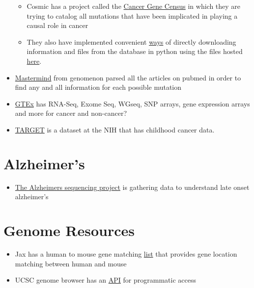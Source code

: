 \documentclass[]{book}
\providecommand{\tightlist}{%
  \setlength{\itemsep}{0pt}\setlength{\parskip}{0pt}}
\begin{document}
\begin{itemize}
  \begin{itemize}
  \tightlist
  \item
    Cosmic has a project called the \href{https://cancer.sanger.ac.uk/cosmic/census?genome=37}{Cancer Gene Census} in which they are trying to catalog all mutations that have been implicated in playing a causal role in cancer
  \item
    They also have implemented convenient \href{https://cancer.sanger.ac.uk/cosmic/help/file_download}{ways} of directly downloading information and files from the database in python using the files hosted \href{https://cancer.sanger.ac.uk/cosmic/download}{here}.
  \end{itemize}
\item
  \href{https://mastermind.genomenon.com/api}{Mastermind} from genomenon parsed all the articles on pubmed in order to find any and all information for each possible mutation
\item
  \href{https://gtexportal.org/home/}{GTEx} has RNA-Seq, Exome Seq, WGseq, SNP arrays, gene expression arrays and more for cancer and non-cancer?
\item
  \href{https://ocg.cancer.gov/programs/target}{TARGET} is a dataset at the NIH that has childhood cancer data.
\end{itemize}

\hypertarget{alzheimers}{%
\section{Alzheimer's}\label{alzheimers}}

\begin{itemize}
\tightlist
\item
  \href{https://www.niagads.org/adsp/content/home}{The Alzheimers sequencing project} is gathering data to understand late onset alzheimer's
\end{itemize}

\hypertarget{genome-resources}{%
\section{Genome Resources}\label{genome-resources}}

\begin{itemize}
\tightlist
\item
  Jax has a human to mouse gene matching \href{http://www.informatics.jax.org/downloads/reports/HOM_MouseHumanSequence.rpt}{list} that provides gene location matching between human and mouse
\item
  UCSC genome browser has an \href{http://genomewiki.ucsc.edu/index.php/Programmatic_access_to_the_Genome_Browser}{API} for programmatic access
\end{itemize}
\end{document}
